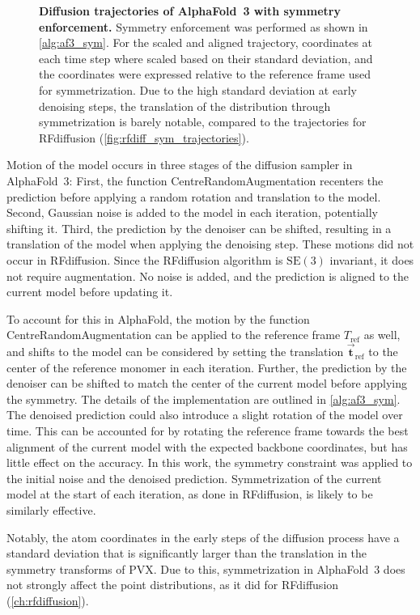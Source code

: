 \begin{figure}[!htb]

\caption{\textbf{Diffusion trajectories of AlphaFold~3 with symmetry enforcement. } Symmetry enforcement was performed as shown in \autoref{alg:af3_sym}. For the scaled and aligned trajectory, coordinates at each time step where scaled based on their standard deviation, and the coordinates were expressed relative to the reference frame used for symmetrization. Due to the high standard deviation at early denoising steps, the translation of the distribution through symmetrization is barely notable, compared to the trajectories for RFdiffusion (\autoref{fig:rfdiff_sym_trajectories}).}
\label{fig:af3_sym_traj}
\end{figure}

Motion of the model occurs in three stages of the diffusion sampler in AlphaFold~3: First, the function CentreRandomAugmentation recenters the prediction before applying a random rotation and translation to the model. Second, Gaussian noise is added to the model in each iteration, potentially shifting it. Third, the prediction by the denoiser can be shifted, resulting in a translation of the model when applying the denoising step. These motions did not occur in RFdiffusion. Since the RFdiffusion algorithm is $\mathrm{SE}(3)$ invariant, it does not require augmentation. No noise is added, and the prediction is aligned to the current model before updating it. 


To account for this in AlphaFold, the motion by the function CentreRandomAugmentation can be applied to the reference frame $T_\text{ref}$ as well, and shifts to the model can be considered by setting the translation $\vec{\mathbf{t}}_{\text{ref}}$ to the center of the reference monomer in each iteration. Further, the prediction by the denoiser can be shifted to match the center of the current model before applying the symmetry. The details of the implementation are outlined in \autoref{alg:af3_sym}. The denoised prediction could also introduce a slight rotation of the model over time. This can be accounted for by rotating the reference frame towards the best alignment of the current model with the expected backbone coordinates, but has little effect on the accuracy. In this work, the symmetry constraint was applied to the initial noise and the denoised prediction. Symmetrization of the current model at the start of each iteration, as done in RFdiffusion, is likely to be similarly effective. 

 Notably, the atom coordinates in the early steps of the diffusion process have a standard deviation that is significantly larger than the translation in the symmetry transforms of PVX. Due to this, symmetrization in AlphaFold~3 does not strongly affect the point distributions, as it did for RFdiffusion (\autoref{ch:rfdiffusion}).

